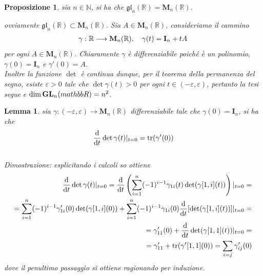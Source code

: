 \documentclass[oneside, 11pt]{amsbook}
\makeatletter
\newcommand{\0}{{(0)}}
\newcommand{\3}{{(3)}}
\theoremstyle{colonplain}
\newtheorem{prop}[thm]{Proposizione}
\newtheorem{lemma}[thm]{Lemma}
\theoremstyle{colondefinition}
\theoremstyle{colonremark}
\numberwithin{equation}{chapter}
\renewcommand{\proofname}{Dimostrazione}
\renewenvironment{proof}[1][\proofname]{\par
  \pushQED{\qed}%
  \normalfont \topsep6\p@\@plus6\p@\relax
  \trivlist
  \item[\hskip\labelsep\bfseries #1:]\ignorespaces
}{%
  \popQED\endtrivlist\@endpefalse
}
\makeatother
\begin{document}
\begin{prop} sia $n \in \mathbb{N}$, si ha che $\mathfrak{gl}_n(\mathbb{R}) = \mathbf{M}_n(\mathbb{R})$. \\

\begin{proof} ovviamente $\mathfrak{gl}_n(\mathbb{R}) \subset \mathbf{M}_n(\mathbb{R})$. Sia $A \in \mathbf{M}_n(\mathbb{R})$, consideriamo il cammino
\begin{align}
    \gamma : \mathbb{R} \longrightarrow \mathbf{M}_n(\mathbb{R}), \quad \gamma(t) = \mathbf{I}_n + tA \notag
\end{align}
per ogni $A \in \mathbf{M}_n(\mathbb{R})$. Chiaramente $\gamma$ è differenziabile poiché è un polinomio,  $\gamma(0) = \mathbf{I}_n$ e $\gamma'(0) = A$. \\
Inoltre la funzione $\det$ è continua dunque, per il teorema della permanenza del segno, esiste $\varepsilon > 0$ tale che $\det \gamma(t) > 0$ per ogni $t \in (-\varepsilon, \varepsilon)$, pertanto la tesi segue e $\dim \mathbf{GL}_n(\\mathbb{R}) = n^2$. \end{proof}
\end{prop}
\begin{lemma}\label{DetDerivTrace} sia $\gamma : (-\varepsilon, \varepsilon) \longrightarrow \mathbf{M}_n(\mathbb{R})$ differenziabile tale che $\gamma(0) = \mathbf{I}_n$, si ha che
\begin{align}
    \frac{\mathrm{d}}{\mathrm{d}t} \det \gamma(t) |_{t = 0} = \mathrm{tr}(\gamma'(0)) \notag
\end{align} \\

\textit{Dimostrazione:} esplicitando i calcoli so ottiene
\begin{align}
    \frac{\mathrm{d}}{\mathrm{d}t} \det \gamma(t)|_{t = 0} = \frac{\mathrm{d}}{\mathrm{d}t} \left( \sum_{i = 1}^n (-1)^{i - 1} \gamma_{1i}(t) \det(\gamma[1, i](t)) \right)|_{t = 0} = \notag \\
    = \sum_{i = 1}^n (-1)^{i - 1}\gamma'_{1i}(0) \det(\gamma[1,i](0)) + \sum_{i = 1}^n (-1)^{i - 1} \gamma_{1i}(0) \frac{\mathrm{d}}{\mathrm{d}t} [\det (\gamma[1, i](t))]|_{t = 0} = \notag \\
    = \gamma'_{11}(0) + \frac{\mathrm{d}}{\mathrm{d}t} \det(\gamma[1, 1](t))|_{t = 0} = \notag \\
    = \gamma'_{11} + \mathrm{tr}(\gamma'[1,1](0)) = \sum_{i = j} \gamma'_{ij}(0) \notag
\end{align}
dove il penultimo passaggio si ottiene ragionando per induzione. \end{lemma}
\end{document}
